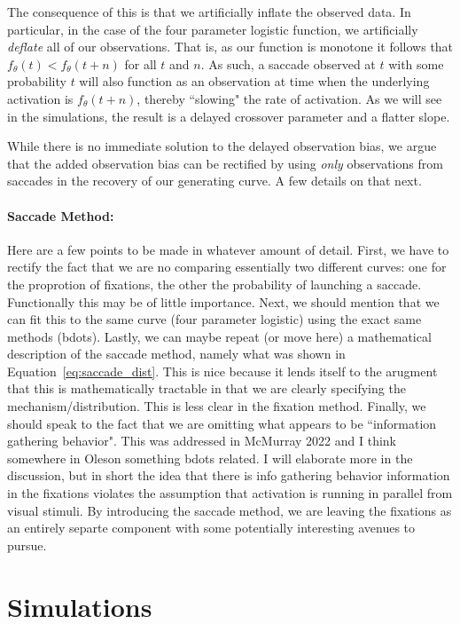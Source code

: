 \documentclass{article}
\begin{document}
The consequence of this is that we artificially inflate the observed data. In particular, in the case of the four parameter logistic function, we artificially \textit{deflate} all of our observations. That is, as our function is monotone it follows that $f_{\theta}(t) < f_{\theta}(t+n)$ for all $t$ and $n$. As such, a saccade observed at $t$ with some probability $t$ will also function as an observation at time when the underlying activation is $f_{\theta}(t+n)$, thereby ``slowing" the rate of activation. As we will see in the simulations, the result is a delayed crossover parameter and a flatter slope.

While there is no immediate solution to the delayed observation bias, we argue that the added observation bias can be rectified by using \textit{only} observations from saccades in the recovery of our generating curve. A few details on that next. 

\paragraph{Saccade Method:} Here are a few points to be made in whatever amount of detail. First, we have to rectify the fact that we are no comparing essentially two different curves: one for the proprotion of fixations, the other the probability of launching a saccade. Functionally this may be of little importance. Next, we should mention that we can fit this to the same curve (four parameter logistic) using the exact same methods (bdots). Lastly, we can maybe repeat (or move here) a mathematical description of the saccade method, namely what was shown in Equation~\ref{eq:saccade_dist}. This is nice because it lends itself to the arugment that this is mathematically tractable in that we are clearly specifying the mechanism/distribution. This is less clear in the fixation method. Finally, we should speak to the fact that we are omitting what appears to be ``information gathering behavior". This was addressed in McMurray 2022 and I think somewhere in Oleson something bdots related. I will elaborate more in the discussion, but in short the idea that there is info gathering behavior information in the fixations violates the assumption that activation is running in parallel from visual stimuli. By introducing the saccade method, we are leaving the fixations as an entirely separte component with some potentially interesting avenues to pursue.

\section{Simulations}
 
\end{document}
